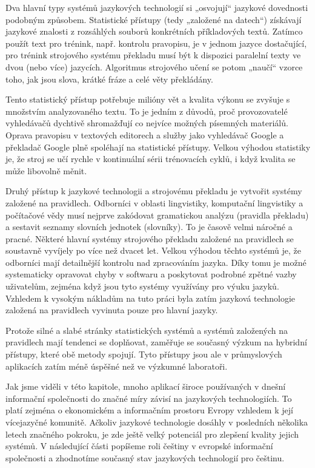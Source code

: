 \begin{multicols}{2}

Dva hlavní typy systémů jazykových technologií si „osvojují“ jazykové dovednosti podobným způsobem. Statistické přístupy (tedy „založené na datech“) získávají jazykové znalosti z rozsáhlých souborů konkrétních příkladových textů. Zatímco použít text pro trénink, např. kontrolu pravopisu, je v jednom jazyce dostačující, pro trénink strojového systému překladu musí být k dispozici paralelní texty ve dvou (nebo více) jazycích. Algoritmus strojového učení se potom „naučí“ vzorce toho, jak jsou slova, krátké fráze a celé věty překládány.

Tento statistický přístup potřebuje milióny vět a kvalita výkonu se zvyšuje s množstvím analyzovaného textu. To je jedním z důvodů, proč provozovatelé vyhledávačů dychtivě shromažďují co nejvíce možných písemných materiálů. Oprava pravopisu v textových editorech a služby jako vyhledávač Google a překladač Google plně spoléhají na statistické přístupy. Velkou výhodou statistiky je, že stroj se učí rychle v kontinuální sérii trénovacích cyklů, i když kvalita se může libovolně měnit.

Druhý přístup k jazykové technologii a strojovému překladu je vytvořit systémy založené na pravidlech. Odborníci v oblasti lingvistiky, komputační lingvistiky a počítačové vědy musí nejprve zakódovat gramatickou analýzu (pravidla překladu) a sestavit seznamy slovních jednotek (slovníky). To je časově velmi náročné a pracné. Některé hlavní systémy strojového překladu založené na pravidlech se soustavně vyvíjely po více než dvacet let. Velkou výhodou těchto systémů je, že odborníci mají detailnější kontrolu nad zpracováním jazyka. Díky tomu je možné systematicky opravovat chyby v softwaru a poskytovat podrobné zpětné vazby uživatelům, zejména když jsou tyto systémy využívány pro výuku jazyků. Vzhledem k vysokým nákladům na tuto práci byla zatím jazyková technologie založená na pravidlech vyvinuta pouze pro hlavní jazyky.

Protože silné a slabé stránky statistických systémů a systémů založených na pravidlech mají tendenci se doplňovat, zaměřuje se současný výzkum na hybridní přístupy, které obě metody spojují. Tyto přístupy jsou ale v průmyslových aplikacích zatím méně úspěšné než ve výzkumné laboratoři.

Jak jsme viděli v této kapitole, mnoho aplikací široce používaných v dnešní informační společnosti do značné míry závisí na jazykových technologiích. To platí zejména o ekonomickém a informačním prostoru Evropy vzhledem k její vícejazyčné komunitě. Ačkoliv jazykové technologie dosáhly v posledních několika letech značného pokroku, je zde ještě velký potenciál pro zlepšení kvality jejich systémů. V následující části popíšeme roli češtiny v evropské informační společnosti a zhodnotíme současný stav jazykových technologií pro češtinu.
\end{multicols}
\clearpage

